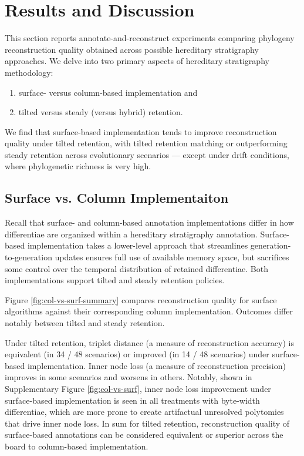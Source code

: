 \section{Results and Discussion} \label{sec:results}

This section reports annotate-and-reconstruct experiments comparing phylogeny reconstruction quality obtained across possible hereditary stratigraphy approaches.
We delve into two primary aspects of hereditary stratigraphy methodology:
\begin{enumerate}
\item surface- versus column-based implementation and
\item tilted versus steady (versus hybrid) retention.
\end{enumerate}

We find that surface-based implementation tends to improve reconstruction quality under tilted retention, with tilted retention matching or outperforming steady retention across evolutionary scenarios --- except under drift conditions, where phylogenetic richness is very high.

\subsection{Surface vs. Column Implementaiton} \label{sec:surface-vs-column}



Recall that surface- and column-based annotation implementations differ in how differentiae are organized within a hereditary stratigraphy annotation.
Surface-based implementation takes a lower-level approach that streamlines generation-to-generation updates ensures full use of available memory space, but sacrifices some control over the temporal distribution of retained differentiae.
Both implementations support tilted and steady retention policies.

Figure \ref{fig:col-vs-surf-summary} compares reconstruction quality for surface algorithms against their corresponding column implementation.
Outcomes differ notably between tilted and steady retention.

Under tilted retention, triplet distance (a measure of reconstruction accuracy) is equivalent (in 34 / 48 scenarios) or improved (in 14 / 48 scenarios) under surface-based implementation.
Inner node loss (a measure of reconstruction precision) improves in some scenarios and worsens in others.
Notably, shown in Supplementary Figure \ref{fig:col-vs-surf}, inner node loss improvement under surface-based implementation is seen in all treatments with byte-width differentiae, which are more prone to create artifactual unresolved polytomies that drive inner node loss.
In sum for tilted retention, reconstruction quality of surface-based annotations can be considered equivalent or superior across the board to column-based implementation.

